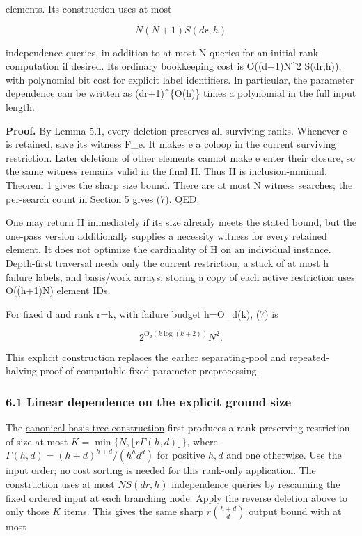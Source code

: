 elements. Its construction uses at most

\[
N(N+1)S(dr,h) \tag{7}
\]

independence queries, in addition to at most N queries for an initial rank computation if desired. Its ordinary bookkeeping cost is O((d+1)N\^{}2 S(dr,h)), with polynomial bit cost for explicit label identifiers. In particular, the parameter dependence can be written as (dr+1)\^{}\{O(h)\} times a polynomial in the full input length.

\textbf{Proof.} By Lemma 5.1, every deletion preserves all surviving ranks. Whenever e is retained, save its witness F\_e. It makes e a coloop in the current surviving restriction. Later deletions of other elements cannot make e enter their closure, so the same witness remains valid in the final H. Thus H is inclusion-minimal. Theorem 1 gives the sharp size bound. There are at most N witness searches; the per-search count in Section 5 gives (7). QED.

One may return H immediately if its size already meets the stated bound, but the one-pass version additionally supplies a necessity witness for every retained element. It does not optimize the cardinality of H on an individual instance. Depth-first traversal needs only the current restriction, a stack of at most h failure labels, and basis/work arrays; storing a copy of each active restriction uses O((h+1)N) element IDs.

For fixed d and rank r=k, with failure budget h=O\_d(k), (7) is

\[
2^{O_d(k\log(k+2))}N^2.
\]

This explicit construction replaces the earlier separating-pool and repeated-halving proof of computable fixed-parameter preprocessing.

\hypertarget{af-4c0863a692-linear-dependence-on-the-explicit-ground-size}{%
\subsubsection{6.1 Linear dependence on the explicit ground size}\label{af-4c0863a692-linear-dependence-on-the-explicit-ground-size}}

The \href{https://github.com/icekylinx/algorithm-frontier/blob/main/problems/matroid-failure-summaries/manuscripts/weighted-oracle-prefix-fpt-construction.md}{canonical-basis tree construction} first produces a rank-preserving restriction of size at most \(K=\min\{N,\lfloor r\Gamma(h,d)\rfloor\}\), where \(\Gamma(h,d)=(h+d)^{h+d}/(h^h d^d)\) for positive \(h,d\) and one otherwise. Use the input order; no cost sorting is needed for this rank-only application. The construction uses at most \(NS(dr,h)\) independence queries by rescanning the fixed ordered input at each branching node. Apply the reverse deletion above to only those \(K\) items. This gives the same sharp \(r\binom{h+d}{d}\) output bound with at most

